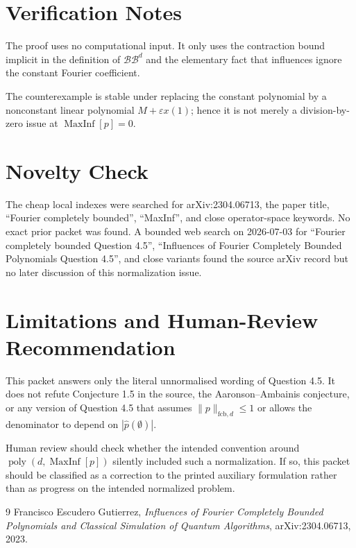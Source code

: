 \documentclass[11pt]{article}
\newcommand{\BB}{\mathscr{BB}}
\newcommand{\MaxInf}{\operatorname{MaxInf}}
\begin{document}
\section*{Verification Notes}

The proof uses no computational input.  It only uses the contraction bound
implicit in the definition of \(\BB^d\) and the elementary fact that influences
ignore the constant Fourier coefficient.

The counterexample is stable under replacing the constant polynomial by a
nonconstant linear polynomial \(M+\varepsilon x(1)\); hence it is not merely a
division-by-zero issue at \(\MaxInf[p]=0\).

\section*{Novelty Check}

The cheap local indexes were searched for arXiv:2304.06713, the paper title,
``Fourier completely bounded'', ``MaxInf'', and close operator-space keywords.
No exact prior packet was found.  A bounded web search on 2026-07-03 for
``Fourier completely bounded Question 4.5'', ``Influences of Fourier Completely
Bounded Polynomials Question 4.5'', and close variants found the source arXiv
record but no later discussion of this normalization issue.

\section*{Limitations and Human-Review Recommendation}

This packet answers only the literal unnormalised wording of Question 4.5.  It
does not refute Conjecture 1.5 in the source, the Aaronson--Ambainis conjecture,
or any version of Question 4.5 that assumes \(\|p\|_{\mathrm{fcb},d}\le1\) or
allows the denominator to depend on \(|\widehat p(\emptyset)|\).

Human review should check whether the intended convention around
\(\operatorname{poly}(d,\MaxInf[p])\) silently included such a normalization.
If so, this packet should be classified as a correction to the printed
auxiliary formulation rather than as progress on the intended normalized
problem.

\begin{thebibliography}{9}
Francisco Escudero Gutierrez,
\emph{Influences of Fourier Completely Bounded Polynomials and Classical
Simulation of Quantum Algorithms},
arXiv:2304.06713, 2023.
\end{thebibliography}
\end{document}

